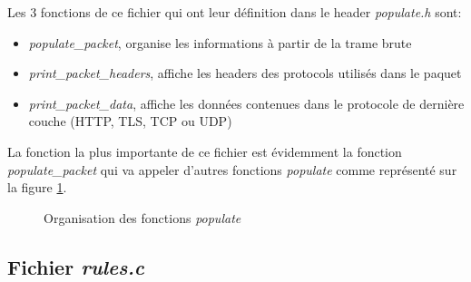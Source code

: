 \documentclass[a4paper]{article}
\begin{document}
Les 3 fonctions de ce fichier qui ont leur définition dans le header \textit{populate.h} sont:
\begin{itemize}
    \item \textit{populate\_packet}, organise les informations à partir de la trame brute
    \item \textit{print\_packet\_headers}, affiche les headers des protocols utilisés dans le paquet
    \item \textit{print\_packet\_data}, affiche les données contenues dans le protocole de dernière couche (HTTP, TLS, TCP ou UDP)
\end{itemize}
La fonction la plus importante de ce fichier est évidemment la fonction \textit{populate\_packet} qui va appeler d'autres fonctions \textit{populate} comme représenté sur la figure \ref{fig:orgpopulate}.
\begin{figure}[H]
    \centering
    \caption{Organisation des fonctions \textit{populate}}
    \label{fig:orgpopulate}
\end{figure}





\subsection{Fichier \textit{rules.c}}
\end{document}
